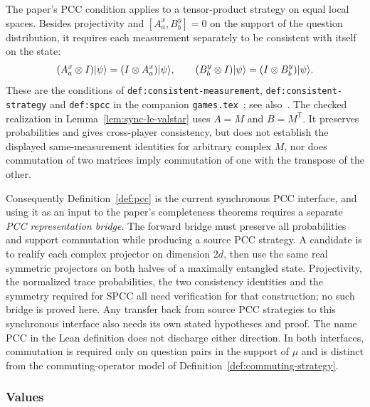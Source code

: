 \begin{remark}
\label{rem:pcc-representation-bridge}
The paper's PCC condition applies to a tensor-product strategy on equal local spaces.
Besides projectivity and $[A^x_a,B^y_b]=0$ on the support of the question distribution,
it requires each measurement separately to be consistent with itself on the state:
\begin{equation*}
  (A^x_a\otimes I)|\psi\rangle=(I\otimes A^x_a)|\psi\rangle,
  \qquad
  (B^y_b\otimes I)|\psi\rangle=(I\otimes B^y_b)|\psi\rangle.
\end{equation*}
These are the conditions of \texttt{def:consistent-measurement},
\texttt{def:consistent-strategy} and \texttt{def:spcc} in the companion
\texttt{games.tex}~\cite{AuditSync26}; see also~\cite[Section 5.2]{JNVWY20}.
The checked realization in Lemma~\ref{lem:sync-le-valstar} uses $A=M$ and
$B=M^{\mathsf T}$. It preserves
probabilities and gives cross-player consistency, but does not establish the displayed
same-measurement identities for arbitrary complex $M$, nor does commutation of two
matrices imply commutation of one with the transpose of the other.

Consequently Definition~\ref{def:pcc} is the current synchronous PCC interface, and
using it as an input to the paper's completeness theorems requires a separate
\emph{PCC representation bridge}. The forward bridge must preserve all probabilities
and support commutation while producing a source PCC strategy. A candidate is to
realify each complex projector on dimension $2d$, then use the same real symmetric
projectors on both halves of a maximally entangled state. Projectivity, the normalized
trace probabilities, the two consistency identities and the symmetry required for
SPCC all need verification for that construction; no such bridge is proved here.
Any transfer back from source PCC strategies to this synchronous interface also needs
its own stated hypotheses and proof. The name PCC in the Lean definition does not
discharge either direction. In both interfaces, commutation is required only on
question pairs in the support of $\mu$ and is distinct from the commuting-operator
model of Definition~\ref{def:commuting-strategy}.
\end{remark}



\subsubsection{Values}

